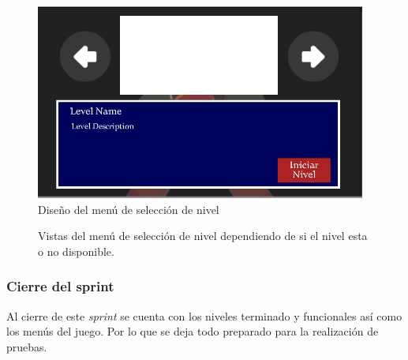 \begin{figure}[h]
		\centering
		\includegraphics[height=0.2 \textheight]{03TrabajoRealizado/imagenes/menuctrlPanel04.png}
		\caption{Diseño del menú de selección de nivel}
		\label{fig:menuSelectIntefaz}
\end{figure}


\begin{figure}
  \centering
   
 	
  \caption{Vistas del menú de selección de nivel dependiendo de si el nivel esta o no disponible.}
  \label{fig:MenuSelect}
\end{figure} 

\subsubsection{Cierre del sprint}
Al cierre de este \textit{sprint} se cuenta con los niveles terminado y funcionales 
así como los menús del juego. Por lo que se deja todo preparado para la realización 
de pruebas.